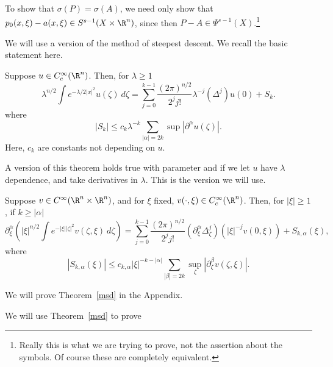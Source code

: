 \documentclass[12pt]{article}
\begin{document}
To show that $\sigma(P) = \sigma(A)$, we need only show that $p_0(x,\xi)-a(x,\xi) \in S^{s-1}(X\times\R^n)$, since then $P-A \in \Psi^{s-1}(X)$.\footnote{Really this is what we are trying to prove, not the assertion about the symbols. Of course these are completely equivalent.}

We will use a version of the method of steepest descent. We recall the basic statement here.
\begin{thm}\label{msdd}Suppose $u \in C_c^\infty(\R^n)$. Then, for $\lambda \geq 1$
\[\lambda^{n/2}\int e^{-\lambda/2 |x|^2}u(\zeta) \ d\zeta = \sum_{j=0}^{k-1} \frac{(2\pi)^{n/2}}{2^jj!}\lambda^{-j}(\Delta^j) u(0) + S_k.\]
where
\[|S_k| \leq c_k\lambda^{-k}\sum_{|\alpha| = 2k} \sup |\partial^{\alpha} u(\zeta)|.\]
Here, $c_k$ are constants not depending on $u$.
\end{thm}

A version of this theorem holds true with parameter and if we let $u$ have $\lambda$ dependence, and take derivatives in $\lambda$. This is the version we will use.
\begin{thm}\label{msd}Suppose $v \in C^\infty(\R^n\times \R^n)$, and for $\xi$ fixed, $v(\cdot,\xi) \in C_c^\infty(\R^n)$. Then, for $|\xi| \geq 1$, if $k \geq |\alpha|$
\[\partial^{\alpha}_\xi \left(|\xi|^{n/2}\int e^{-|\xi||\zeta|^2}v(\zeta,\xi)\ d\zeta\right) = \sum_{j=0}^{k-1} \frac{(2\pi)^{n/2}}{2^j j!}(\partial_{\xi}^{\alpha}\Delta_\zeta^j) (|\xi|^{-j} v(0,\xi)) + S_{k,\alpha}(\xi),\]
where
\[|S_{k,\alpha}(\xi)|  \leq c_{k,\alpha}|\xi|^{-k-|\alpha|}\sum_{|\beta| = 2k} \sup_\zeta |\partial_\zeta^{\beta} v(\zeta,\xi)|.\]
\end{thm}

We will prove Theorem~\ref{msd} in the Appendix.

We will use Theorem~\ref{msd} to prove
\end{document}
